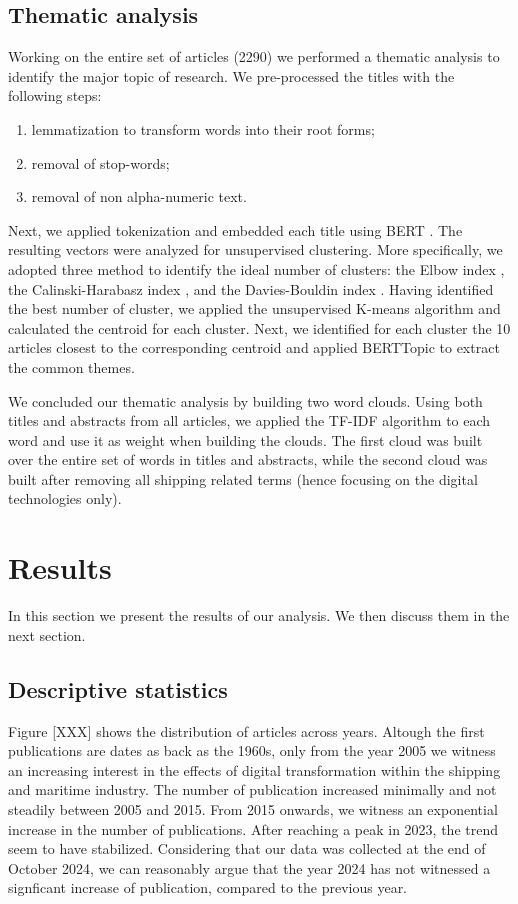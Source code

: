 \documentclass[a4paper, review, endfloat, authoryear]{elsarticle}
\begin{document}
	\subsection{Thematic analysis}
	Working on the entire set of articles (2290) we performed a thematic analysis to identify the major topic of research. We pre-processed the titles with the following steps:
	\begin{enumerate}
		\item lemmatization to transform words into their root forms;
		\item removal of stop-words;
		\item removal of non alpha-numeric text.
	\end{enumerate}
	Next, we applied tokenization and embedded each title using BERT \citep{devlin2018bert}. The resulting vectors were analyzed for unsupervised clustering. More specifically, we adopted three method to identify the ideal number of clusters: the Elbow index \citep{cui2020introduction}, the Calinski-Harabasz index \citep{calinski1974dendrite}, and the Davies-Bouldin index \citep{davies1979cluster}.
	Having identified the best number of cluster, we applied the unsupervised K-means algorithm and calculated the centroid for each cluster.
	Next, we identified for each cluster the 10 articles closest to the corresponding centroid and applied BERTTopic to extract the common themes.
	
	We concluded our thematic analysis by building two word clouds. Using both titles and abstracts from all articles, we applied the TF-IDF algorithm to each word and use it as weight when building the clouds. The first cloud was built over the entire set of words in titles and abstracts, while the second cloud was built after removing all shipping related terms (hence focusing on the digital technologies only).
	
	\section{Results}
	In this section we present the results of our analysis. We then discuss them in the next section.
	
	\subsection{Descriptive statistics}
	Figure [XXX] shows the distribution of articles across years. Altough the first publications are dates as back as the 1960s, only from the year 2005 we witness an increasing interest in the effects of digital transformation within the shipping and maritime industry. The number of publication increased minimally and not steadily between 2005 and 2015. From 2015 onwards, we witness an exponential increase in the number of publications. After reaching a peak in 2023, the trend seem to have stabilized. Considering that our data was collected at the end of October 2024, we can reasonably argue that the year 2024 has not witnessed a signficant increase of publication, compared to the previous year.
	
\end{document}
